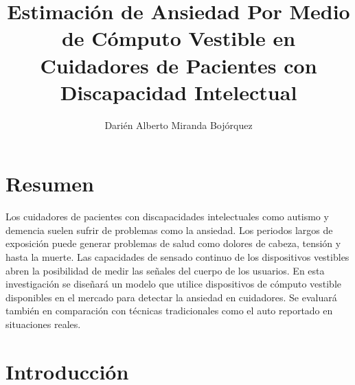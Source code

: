 \documentclass[letterpaper,12pt]{cicese}
\begin{document}
	\doublespace
	\title{Estimaci\'on de Ansiedad Por Medio de C\'omputo Vestible en Cuidadores de Pacientes con Discapacidad Intelectual}
	\author{Dari\'en Alberto Miranda Boj\'orquez}
	\maketitle
	\newpage
	\tableofcontents
	\newpage
		\chapter{Resumen}
			Los cuidadores de pacientes con discapacidades intelectuales como autismo y demencia suelen sufrir de problemas como la ansiedad. Los periodos largos de exposici\'on puede generar problemas de salud como dolores de cabeza, tensi\'on y hasta la muerte. Las capacidades de sensado continuo de los dispositivos vestibles abren la posibilidad de medir las se\~nales del cuerpo de los usuarios. En esta investigaci\'on se dise\~nar\'a un modelo que utilice dispositivos de c\'omputo vestible disponibles en el mercado para detectar la ansiedad en cuidadores. Se evaluar\'a tambi\'en en comparaci\'on con t\'ecnicas tradicionales como el auto reportado en situaciones reales.
		\chapter{Introducci\'on} 
			
\end{document}
